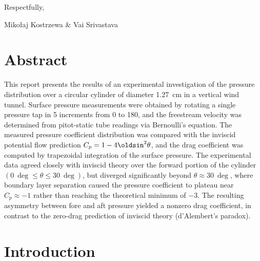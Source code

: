 \vspace{5.0ex}

Respectfully,

Mikołaj Kostrzewa \& Vai Srivastava


\pagebreak

\thispagestyle{empty}
\hypertarget{tableofcontents}{\tableofcontents}

\renewcommand{\listfigurename}{Figures}
\listoffigures

\renewcommand{\listtablename}{Tables}
\listoftables

\renewcommand{\listlistingname}{Listings}
\listoflistings

\newpage
{}


\section{Abstract} \label{sec:abstract}

This report presents the results of an experimental investigation of the pressure distribution over a circular cylinder of diameter \qty{1.27}{\cm} in a vertical wind tunnel. Surface pressure measurements were obtained by rotating a single pressure tap in \qty{5}{\deg} increments from \qty{0}{\deg} to \qty{180}{\deg}, and the freestream velocity was determined from pitot-static tube readings via Bernoulli's equation. The measured pressure coefficient distribution was compared with the inviscid potential flow prediction \(C_p=1-4 \oldsin ^2 \theta\), and the drag coefficient was computed by trapezoidal integration of the surface pressure. The experimental data agreed closely with inviscid theory over the forward portion of the cylinder \(\left(\qty{0}{\deg} \leq \theta \leq \qty{30}{\deg}\right)\), but diverged significantly beyond \(\theta \approx \qty{30}{\deg}\), where boundary layer separation caused the pressure coefficient to plateau near \(C_p \approx-1\) rather than reaching the theoretical minimum of \(-3\). The resulting asymmetry between fore and aft pressure yielded a nonzero drag coefficient, in contrast to the zero-drag prediction of inviscid theory (d'Alembert's paradox).

\section{Introduction} \label{sec:introduction}

